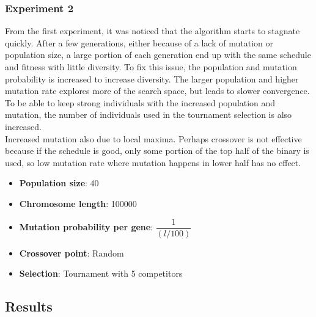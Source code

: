 \documentclass{article}
\newcommand{\n}[0]{\\[\baselineskip]}
\begin{document}
\subsubsection{Experiment 2}
From the first experiment, it was noticed that the algorithm starts to stagnate quickly. After a few generations, either because of a lack of mutation or population size, a large portion of each generation end up with the same schedule and fitness with little diversity. To fix this issue, the population and mutation probability is increased to increase diversity. The larger population and higher mutation rate explores more of the search space, but leads to slower convergence. To be able to keep strong individuals with the increased population and mutation, the number of individuals used in the tournament selection is also increased.
\n
Increased mutation also due to local maxima. Perhaps crossover is not effective because if the schedule is good, only some portion of the top half of the binary is used, so low mutation rate where mutation happens in lower half has no effect.
\begin{itemize}
\item \textbf{Population size}: 40
\item \textbf{Chromosome length}: 100000
\item \textbf{Mutation probability per gene}: $\dfrac{1}{(l/100)}$
\item \textbf{Crossover point}: Random
\item \textbf{Selection}: Tournament with 5 competitors
\end{itemize}

\subsection{Results}
\end{document}
